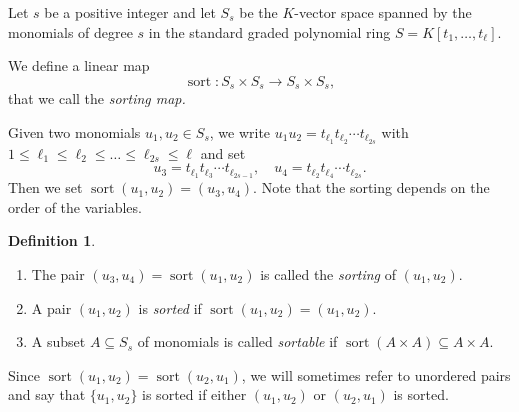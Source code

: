 \documentclass[12pt]{amsart}
\numberwithin{equation}{section}
\theoremstyle{definition}
\newtheorem{definition}[theorem]{Definition}
\def\sort{\operatorname{sort}}
\begin{document}
Let $s$ be a positive integer and let $S_s$ be the
$K$-vector space spanned by the
monomials of degree $s$ in the standard graded polynomial ring $S = K[t_1,\ldots,t_{\ell}]$. 

We define a linear map
$$\sort: S_s \times S_s \to S_s \times S_s,$$ 
that we call the \emph{sorting map.}

Given two monomials $u_1,u_2\in
S_s$, we write $u_1u_2 = t_{\ell_1}t_{\ell_2}\cdots t_{\ell_{2s}}$ with $1\le \ell_1\le \ell_2\le\ldots\le \ell_{2s} \le \ell$ and set
$$u_3=t_{\ell_1}t_{\ell_3}\cdots t_{\ell_{2s-1}},\quad u_4= t_{\ell_2}t_{\ell_4}\cdots t_{\ell_{2s}}.$$ Then we set $\sort(u_1, u_2)=(u_3,u_4).$ 
Note that the sorting depends on the order of the variables.

\begin{definition}
\label{def: sorting} 
\begin{enumerate}
\item The pair $(u_3,u_4)=\sort(u_1, u_2)$ is called the \emph{sorting} of $(u_1, u_2)$. 
\item A pair $(u_1, u_2)$ is \emph{sorted} if $\sort(u_1, u_2)=(u_1, u_2)$. 
\item A subset $A \subseteq S_s$ of monomials is called \emph{sortable} if
$\sort(A \times A) \subseteq A \times A$. 
\end{enumerate}
\end{definition}
Since $\sort(u_1,u_2)=\sort (u_2,u_1)$, we will sometimes refer to unordered pairs and say that $\{u_1,u_2\}$ is sorted if either $(u_1, u_2)$ or $(u_2, u_1)$ is sorted.
\end{document}

